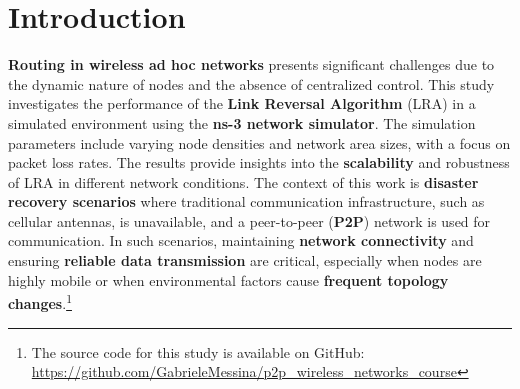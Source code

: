\documentclass[../report.tex]{subfiles}
\begin{document}
\section{Introduction}
\textbf{Routing in wireless ad hoc networks} presents significant challenges due to the dynamic nature of nodes and the absence of centralized control. This study investigates the performance of the \textbf{Link Reversal Algorithm} (LRA\cite{gafni1981distributed}) in a simulated environment using the \textbf{ns-3 network simulator}\cite{ns3}. The simulation parameters include varying node densities and network area sizes, with a focus on packet loss rates. The results provide insights into the \textbf{scalability} and robustness of LRA in different network conditions. The context of this work is \textbf{disaster recovery scenarios} where traditional communication infrastructure, such as cellular antennas, is unavailable, and a peer-to-peer (\textbf{P2P}) network is used for communication. In such scenarios, maintaining \textbf{network connectivity} and ensuring \textbf{reliable data transmission} are critical, especially when nodes are highly mobile or when environmental factors cause \textbf{frequent topology changes}.\footnote{
The source code for this study is available on GitHub: \url{https://github.com/GabrieleMessina/p2p_wireless_networks_course}
}
\end{document}
